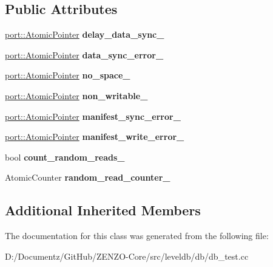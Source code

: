\subsection*{Public Attributes}
\begin{DoxyCompactItemize}
\item 
\mbox{\label{classleveldb_1_1_special_env_af8a6a4d77f11f6986cb1d00f3cf9d37a}} 
\mbox{\hyperlink{classleveldb_1_1port_1_1_atomic_pointer}{port\+::\+Atomic\+Pointer}} {\bfseries delay\+\_\+data\+\_\+sync\+\_\+}
\item 
\mbox{\label{classleveldb_1_1_special_env_ae468cdabd36e0b9fde534bb25a47499f}} 
\mbox{\hyperlink{classleveldb_1_1port_1_1_atomic_pointer}{port\+::\+Atomic\+Pointer}} {\bfseries data\+\_\+sync\+\_\+error\+\_\+}
\item 
\mbox{\label{classleveldb_1_1_special_env_a21c9400bf22bd43f75349677b4d3413b}} 
\mbox{\hyperlink{classleveldb_1_1port_1_1_atomic_pointer}{port\+::\+Atomic\+Pointer}} {\bfseries no\+\_\+space\+\_\+}
\item 
\mbox{\label{classleveldb_1_1_special_env_a3ecf4339c101366198febb32cfe938f0}} 
\mbox{\hyperlink{classleveldb_1_1port_1_1_atomic_pointer}{port\+::\+Atomic\+Pointer}} {\bfseries non\+\_\+writable\+\_\+}
\item 
\mbox{\label{classleveldb_1_1_special_env_a354d87bbdeb456c36877e506872bcc04}} 
\mbox{\hyperlink{classleveldb_1_1port_1_1_atomic_pointer}{port\+::\+Atomic\+Pointer}} {\bfseries manifest\+\_\+sync\+\_\+error\+\_\+}
\item 
\mbox{\label{classleveldb_1_1_special_env_a7a6fafc967db1ba7594676d372b7fbec}} 
\mbox{\hyperlink{classleveldb_1_1port_1_1_atomic_pointer}{port\+::\+Atomic\+Pointer}} {\bfseries manifest\+\_\+write\+\_\+error\+\_\+}
\item 
\mbox{\label{classleveldb_1_1_special_env_aaf50860248689bda9993dfdcfb53855a}} 
bool {\bfseries count\+\_\+random\+\_\+reads\+\_\+}
\item 
\mbox{\label{classleveldb_1_1_special_env_a7cf0b2e4dcd63460e8776ae3a2c70bee}} 
Atomic\+Counter {\bfseries random\+\_\+read\+\_\+counter\+\_\+}
\end{DoxyCompactItemize}
\subsection*{Additional Inherited Members}


The documentation for this class was generated from the following file\+:\begin{DoxyCompactItemize}
\item 
D\+:/\+Documentz/\+Git\+Hub/\+Z\+E\+N\+Z\+O-\/\+Core/src/leveldb/db/db\+\_\+test.\+cc\end{DoxyCompactItemize}
